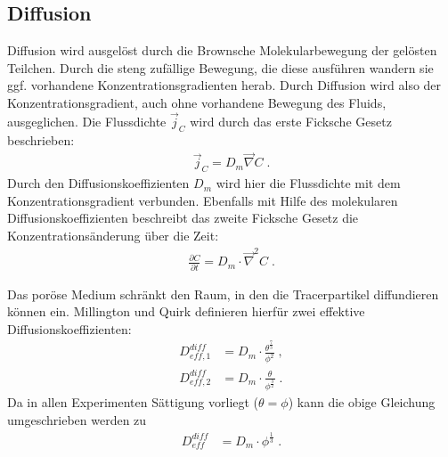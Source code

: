 
\subsection{Diffusion}
\label{sec:diff}
Diffusion wird ausgelöst durch die Brownsche Molekularbewegung der gelösten Teilchen. Durch die steng zufällige Bewegung, die diese ausführen wandern sie ggf. vorhandene Konzentrationsgradienten herab. 
Durch Diffusion wird also der Konzentrationsgradient, auch ohne vorhandene Bewegung des Fluids, ausgeglichen. Die Flussdichte $\vec{j}_C$ wird durch das erste Ficksche Gesetz beschrieben:
\begin{align}
 \vec{j}_C = D_m \vec{\nabla} C \; .
\end{align}
Durch den Diffusionskoeffizienten $D_m$ wird hier die Flussdichte mit dem Konzentrationsgradient verbunden.
Ebenfalls mit Hilfe des molekularen Diffusionskoeffizienten beschreibt das zweite Ficksche Gesetz die Konzentrationsänderung über die Zeit:
\begin{align}
 \frac{\partial C}{\partial t} = D_m \cdot \vec{\nabla}^2 C \; .
 \label{eq:fick2}
\end{align}

Das poröse Medium schränkt den Raum, in den die Tracerpartikel diffundieren können ein. Millington und Quirk \citeyearpar{milli-quir} definieren hierfür zwei 
effektive Diffusionskoeffizienten:
\begin{align}
 D_{eff, 1}^{diff} &= D_m \cdot \frac{\theta^{\frac{7}{3}}}{\phi^2} \; , \\
 D_{eff, 2}^{diff} &= D_m \cdot \frac{\theta}{              \phi^\frac{3}{2}} \; .
\end{align}
Da in allen Experimenten Sättigung vorliegt \mbox{($\theta = \phi$)} kann die obige Gleichung umgeschrieben werden zu
\begin{align}
 D_{eff}^{diff} &= D_m \cdot \phi^{\frac{1}{3}} \; .
 \label{eq:Deff}
\end{align}

